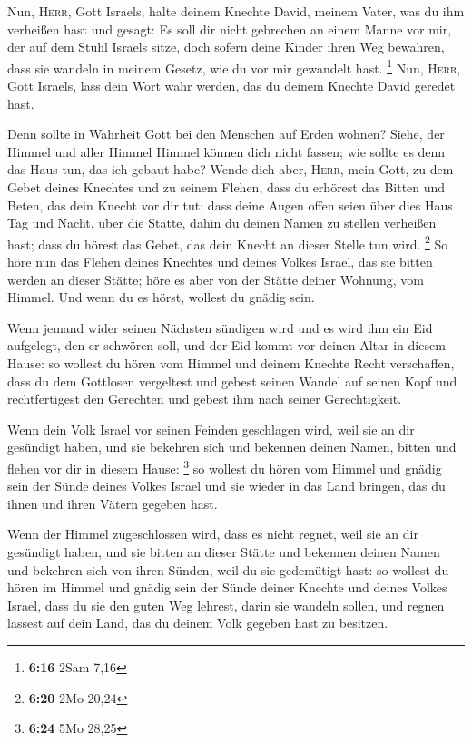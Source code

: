  Nun, \textsc{Herr}, Gott Israels, halte deinem Knechte
David, meinem Vater, was du ihm verheißen hast und gesagt: Es soll dir
nicht gebrechen an einem Manne vor mir, der auf dem Stuhl Israels sitze,
doch sofern deine Kinder ihren Weg bewahren, dass sie wandeln in meinem
Gesetz, wie du vor mir gewandelt hast. \footnote{\textbf{6:16} 2Sam 7,16}
 Nun, \textsc{Herr}, Gott Israels, lass dein Wort wahr
werden, das du deinem Knechte David geredet hast.

 Denn sollte in Wahrheit Gott bei den Menschen auf Erden
wohnen? Siehe, der Himmel und aller Himmel Himmel können dich nicht
fassen; wie sollte es denn das Haus tun, das ich gebaut habe?
 Wende dich aber, \textsc{Herr}, mein Gott, zu dem Gebet
deines Knechtes und zu seinem Flehen, dass du erhörest das Bitten und
Beten, das dein Knecht vor dir tut;  dass deine Augen
offen seien über dies Haus Tag und Nacht, über die Stätte, dahin du
deinen Namen zu stellen verheißen hast; dass du hörest das Gebet, das
dein Knecht an dieser Stelle tun wird. \footnote{\textbf{6:20} 2Mo 20,24}
 So höre nun das Flehen deines Knechtes und deines Volkes
Israel, das sie bitten werden an dieser Stätte; höre es aber von der
Stätte deiner Wohnung, vom Himmel. Und wenn du es hörst, wollest du
gnädig sein.

 Wenn jemand wider seinen Nächsten sündigen wird und es
wird ihm ein Eid aufgelegt, den er schwören soll, und der Eid kommt vor
deinen Altar in diesem Hause:  so wollest du hören vom
Himmel und deinem Knechte Recht verschaffen, dass du dem Gottlosen
vergeltest und gebest seinen Wandel auf seinen Kopf und rechtfertigest
den Gerechten und gebest ihm nach seiner Gerechtigkeit.

 Wenn dein Volk Israel vor seinen Feinden geschlagen
wird, weil sie an dir gesündigt haben, und sie bekehren sich und
bekennen deinen Namen, bitten und flehen vor dir in diesem Hause:
\footnote{\textbf{6:24} 5Mo 28,25}  so wollest du hören
vom Himmel und gnädig sein der Sünde deines Volkes Israel und sie wieder
in das Land bringen, das du ihnen und ihren Vätern gegeben hast.

 Wenn der Himmel zugeschlossen wird, dass es nicht
regnet, weil sie an dir gesündigt haben, und sie bitten an dieser Stätte
und bekennen deinen Namen und bekehren sich von ihren Sünden, weil du
sie gedemütigt hast:  so wollest du hören im Himmel und
gnädig sein der Sünde deiner Knechte und deines Volkes Israel, dass du
sie den guten Weg lehrest, darin sie wandeln sollen, und regnen lassest
auf dein Land, das du deinem Volk gegeben hast zu besitzen.

